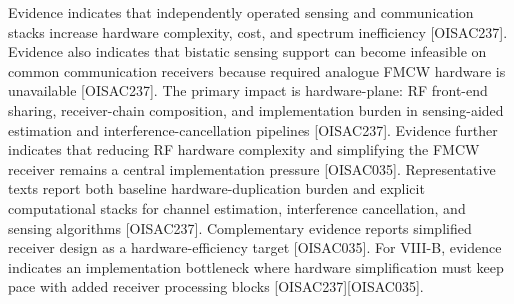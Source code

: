 {}\markdownRendererOlBegin
{} Evidence indicates that independently operated sensing and communication stacks increase hardware complexity, cost, and spectrum inefficiency [O\markdownRendererUnderscore{}ISAC\markdownRendererUnderscore{}237]. Evidence also indicates that bistatic sensing support can become infeasible on common communication receivers because required analogue FMCW hardware is unavailable [O\markdownRendererUnderscore{}ISAC\markdownRendererUnderscore{}237].\markdownRendererOlItemEnd 
{} The primary impact is hardware-plane: RF front-end sharing, receiver-chain composition, and implementation burden in sensing-aided estimation and interference-cancellation pipelines [O\markdownRendererUnderscore{}ISAC\markdownRendererUnderscore{}237]. Evidence further indicates that reducing RF hardware complexity and simplifying the FMCW receiver remains a central implementation pressure [O\markdownRendererUnderscore{}ISAC\markdownRendererUnderscore{}035].\markdownRendererOlItemEnd 
{} Representative texts report both baseline hardware-duplication burden and explicit computational stacks for channel estimation, interference cancellation, and sensing algorithms [O\markdownRendererUnderscore{}ISAC\markdownRendererUnderscore{}237]. Complementary evidence reports simplified receiver design as a hardware-efficiency target [O\markdownRendererUnderscore{}ISAC\markdownRendererUnderscore{}035].\markdownRendererOlItemEnd 
{} For VIII-B, evidence indicates an implementation bottleneck where hardware simplification must keep pace with added receiver processing blocks [O\markdownRendererUnderscore{}ISAC\markdownRendererUnderscore{}237][O\markdownRendererUnderscore{}ISAC\markdownRendererUnderscore{}035].\markdownRendererOlItemEnd 
\markdownRendererOlEnd \markdownRendererInterblockSeparator
{}
\markdownRendererSectionEnd \markdownRendererSectionBegin
{}\markdownRendererInterblockSeparator
